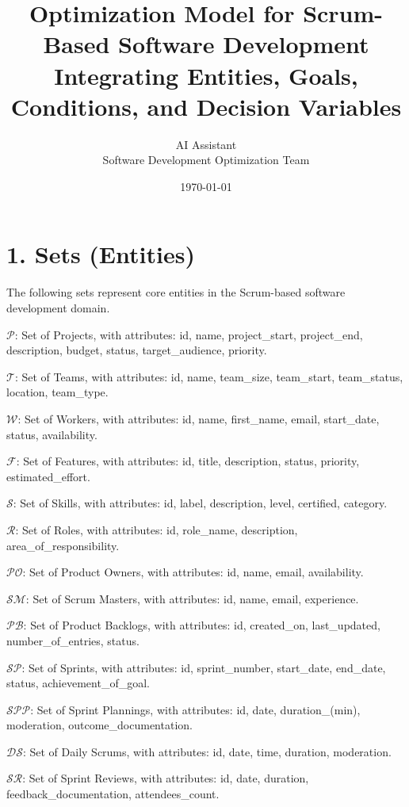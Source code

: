 \documentclass[12pt]{article}
\title{\Huge Optimization Model for Scrum-Based Software Development\\[0.5cm]
\Large Integrating Entities, Goals, Conditions, and Decision Variables}
\author{\Large AI Assistant \\ Software Development Optimization Team}
\date{\today}
\begin{document}
\maketitle

\tableofcontents
\newpage

\section{1. Sets (Entities)}

The following sets represent core entities in the Scrum-based software development domain.

\item $ \mathcal{P} $: Set of Projects, with attributes: id, name, project\_start, project\_end, description, budget, status, target\_audience, priority.
    \item $ \mathcal{T} $: Set of Teams, with attributes: id, name, team\_size, team\_start, team\_status, location, team\_type.
    \item $ \mathcal{W} $: Set of Workers, with attributes: id, name, first\_name, email, start\_date, status, availability.
    \item $ \mathcal{F} $: Set of Features, with attributes: id, title, description, status, priority, estimated\_effort.
    \item $ \mathcal{S} $: Set of Skills, with attributes: id, label, description, level, certified, category.
    \item $ \mathcal{R} $: Set of Roles, with attributes: id, role\_name, description, area\_of\_responsibility.
    \item $ \mathcal{PO} $: Set of Product Owners, with attributes: id, name, email, availability.
    \item $ \mathcal{SM} $: Set of Scrum Masters, with attributes: id, name, email, experience.
    \item $ \mathcal{PB} $: Set of Product Backlogs, with attributes: id, created\_on, last\_updated, number\_of\_entries, status.
    \item $ \mathcal{SP} $: Set of Sprints, with attributes: id, sprint\_number, start\_date, end\_date, status, achievement\_of\_goal.
    \item $ \mathcal{SPP} $: Set of Sprint Plannings, with attributes: id, date, duration\_(min), moderation, outcome\_documentation.
    \item $ \mathcal{DS} $: Set of Daily Scrums, with attributes: id, date, time, duration, moderation.
    \item $ \mathcal{SR} $: Set of Sprint Reviews, with attributes: id, date, duration, feedback\_documentation, attendees\_count.
\end{document}

